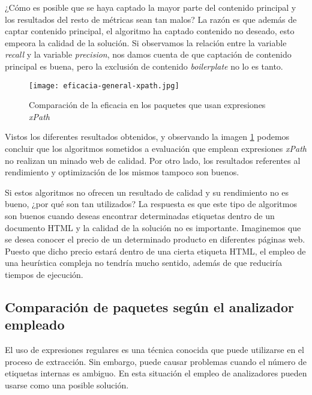 ¿Cómo es posible que se haya captado la mayor parte del contenido principal y los resultados del resto de
métricas sean tan malos? La razón es que además de captar contenido principal, el algoritmo ha captado
contenido no deseado, esto empeora la calidad de la solución. Si observamos la relación entre la variable
\emph{recall} y la variable \emph{precision}, nos damos cuenta de que captación de contenido principal es
buena, pero la exclusión de contenido \emph{boilerplate} no lo es tanto.

\begin{figure}[tphb]
    \centering
    \texttt{[image: eficacia-general-xpath.jpg]}
    \caption{Comparación de la eficacia en los paquetes que usan expresiones \emph{xPath}}
    \label{img:comparacion de la eficacia en los paquetes que usan expresiones xPath}
\end{figure}

Vistos los diferentes resultados obtenidos, y observando la imagen 
\ref{img:comparacion de la eficacia en los paquetes que usan expresiones xPath} podemos concluir que los 
algoritmos sometidos a evaluación que emplean expresiones \emph{xPath} no realizan un minado web de calidad. 
Por otro lado, los resultados referentes al rendimiento y optimización de los mismos tampoco son buenos.

Si estos algoritmos no ofrecen un resultado de calidad y su rendimiento no es bueno, ¿por qué son tan
utilizados? La respuesta es que este tipo de algoritmos son buenos cuando deseas encontrar determinadas
etiquetas dentro de un documento HTML y la calidad de la solución no es importante. Imaginemos que se desea
conocer el precio de un determinado producto en diferentes páginas web. Puesto que dicho precio estará
dentro de una cierta etiqueta HTML, el empleo de una heurística compleja no tendría mucho sentido, además
de que reduciría tiempos de ejecución.

\subsection{Comparación de paquetes según el analizador empleado}
\label{subsec:comparacion de paquetes segun el analizador empleado}

El uso de expresiones regulares es una técnica conocida que puede utilizarse en el proceso de extracción.
Sin embargo, puede causar problemas cuando el número de etiquetas internas es ambiguo. En esta situación
el empleo de analizadores pueden usarse como una posible solución.

